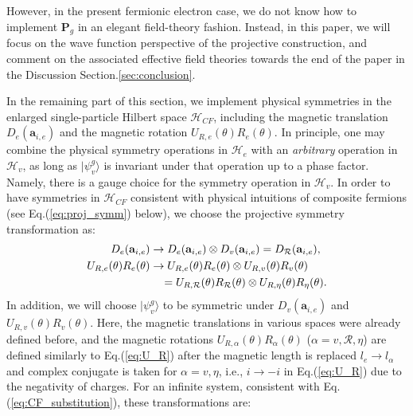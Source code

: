 However, in the present fermionic electron case, we do not know how to implement $\mathbf P_g$ in an elegant field-theory fashion. Instead, in this paper, we will focus on the wave function perspective of the projective construction, and comment on the associated effective field theories towards the end of the paper in the Discussion Section.\ref{sec:conclusion}.

In the remaining part of this section, we implement physical symmetries in the enlarged single-particle Hilbert space $\mathcal H_{CF}$, including the magnetic translation $D_e(\mathbf a_{i,e})$ and the magnetic rotation $U_{R,e}(\theta)R_e(\theta)$. In principle, one may combine the physical symmetry operations in $\mathcal H_e$ with an \emph{arbitrary} operation in $\mathcal H_v$, as long as $|\psi_v^g\rangle$ is invariant under that operation up to a phase factor. Namely, there is a gauge choice for the symmetry operation in $\mathcal H_v$. In order to have symmetries in $\mathcal H_{CF}$ consistent with physical intuitions of composite fermions (see Eq.(\ref{eq:proj_symm}) below), we choose the projective symmetry transformation as:
\begin{align}
    D_e(\mathbf a_{i,e})       & \rightarrow D_e(\mathbf a_{i,e})\otimes D_v(\mathbf a_{i,e})=D_{\mathcal R}(\mathbf a_{i,e}),\notag \\
    U_{R,e}(\theta)R_e(\theta) & \rightarrow U_{R,e}(\theta)R_e(\theta)\otimes U_{R,v}(\theta)R_v(\theta)\notag                      \\
                               & \quad=U_{R,\mathcal R}(\theta)R_{\mathcal R}(\theta)\otimes U_{R,\eta}(\theta)R_{\eta}(\theta).
\end{align}
In addition, we will choose $|\psi_v^g\rangle$ to be symmetric under $D_v(\mathbf a_{i,e})$ and $U_{R,v}(\theta)R_v(\theta)$. Here, the magnetic translations in various spaces were already defined before, and the magnetic rotations $U_{R,\alpha}(\theta)R_{\alpha}(\theta)$ ($\alpha=v,\mathcal R,\eta$) are defined similarly to Eq.(\ref{eq:U_R}) after the magnetic length is replaced $l_e\rightarrow l_{\alpha}$ and complex conjugate is taken for $\alpha=v,\eta$, i.e., $i\rightarrow -i$ in Eq.(\ref{eq:U_R}) due to the negativity of charges. For an infinite system, consistent with Eq.(\ref{eq:CF_substitution}), these transformations are:
